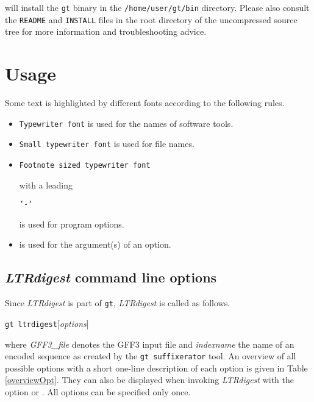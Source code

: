 \documentclass[12pt,titlepage]{article}
\newcommand{\LTRdigest}{\textit{LTRdigest}\xspace}
\newcommand{\GtLTRdigest}{\texttt{gt ltrdigest}\xspace}
\newcommand{\Gt}{\texttt{gt}\xspace}
\newcommand{\Gtsuffixerator}{\texttt{gt suffixerator}\xspace}
\begin{document}
will install the \Gt binary in the \texttt{/home/user/gt/bin} directory.
Please also consult the \texttt{README} and \texttt{INSTALL} files in the root directory of the uncompressed source tree for more information and troubleshooting advice.

\section{Usage} \label{Usage}

Some text is highlighted by different fonts according to the following rules.

\begin{itemize}
\item \texttt{Typewriter font} is used for the names of software tools.
\item \texttt{\small{Small typewriter font}} is used for file names.
\item \begin{footnotesize}\texttt{Footnote sized typewriter font}
      \end{footnotesize} with a leading
      \begin{footnotesize}\texttt{'-'}\end{footnotesize}
      is used for program options.
\item {} is used for the argument(s) of an
      option.
\end{itemize}

\subsection{\LTRdigest command line options}

Since \LTRdigest is part of \Gt, \LTRdigest is called as follows.

\GtLTRdigest  $[$\emph{options}$]$  

where \emph{GFF3\_file} denotes the GFF3 input file and \emph{indexname} the name of an encoded sequence as created by the \Gtsuffixerator tool.
An overview of all possible options with a short one-line description of
each option is given in Table \ref{overviewOpt}. They can also be displayed when invoking \LTRdigest with the option  or .
All options can be specified only once.
\end{document}
